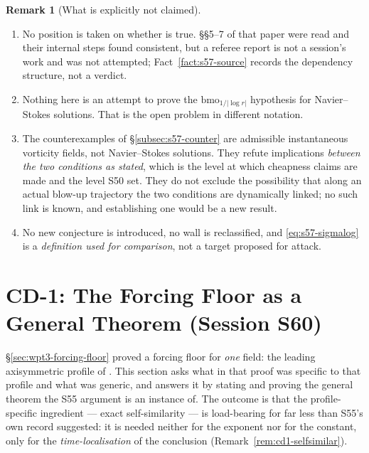 \documentclass[11pt]{article}
\theoremstyle{definition}
\newtheorem{remark}[theorem]{Remark}
\theoremstyle{remark}
\begin{document}
\begin{remark}[What is explicitly not claimed]\label{rem:s57-notclaimed}
  \begin{enumerate}[label=\textup{(\roman*)},leftmargin=2.6em]
  \item No position is taken on whether
    \cite[Thm.~7.4]{Grujic2026Log} is true. \S\S5--7 of that paper were read
    and their internal steps found consistent, but a referee report is not a
    session's work and was not attempted; Fact~\ref{fact:s57-source} records
    the dependency structure, not a verdict.
  \item Nothing here is an attempt to prove the
    $\mathrm{bmo}_{1/|\log r|}$ hypothesis for Navier--Stokes solutions.
    That is the open problem in different notation.
  \item The counterexamples of \S\ref{subsec:s57-counter} are admissible
    instantaneous vorticity fields, not Navier--Stokes solutions. They refute
    implications \emph{between the two conditions as stated}, which is the
    level at which cheapness claims are made and the level S50 set. They do
    not exclude the possibility that along an actual blow-up trajectory the
    two conditions are dynamically linked; no such link is known, and
    establishing one would be a new result.
  \item No new conjecture is introduced, no wall is reclassified, and
    \eqref{eq:s57-sigmalog} is a \emph{definition used for comparison}, not a
    target proposed for attack.
  \end{enumerate}
\end{remark}

\section{CD-1: The Forcing Floor as a General Theorem
  (Session S60)}
\label{sec:cd1-general-floor}

\S\ref{sec:wpt3-forcing-floor} proved a forcing floor for \emph{one} field:
the leading axisymmetric profile of \cite{OpenAI2026}. This section asks what
in that proof was specific to that profile and what was generic, and answers
it by stating and proving the general theorem the S55 argument is an instance
of. The outcome is that the profile-specific ingredient --- exact
self-similarity --- is load-bearing for far less than S55's own record
suggested: it is needed neither for the exponent nor for the constant, only
for the \emph{time-localisation} of the conclusion
(Remark~\ref{rem:cd1-selfsimilar}).
\end{document}
